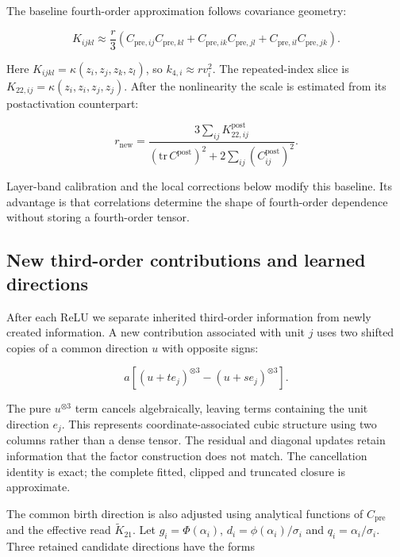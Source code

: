 \documentclass[11pt,letterpaper]{article}
\begin{document}
The baseline fourth-order approximation follows covariance geometry:

\begin{equation}
K_{ijkl}\approx\frac{r}{3}
\left(C_{\mathrm{pre},ij}C_{\mathrm{pre},kl}+C_{\mathrm{pre},ik}C_{\mathrm{pre},jl}+C_{\mathrm{pre},il}C_{\mathrm{pre},jk}\right).
\end{equation}

Here \(K_{ijkl}=\kappa(z_i,z_j,z_k,z_l)\), so \(k_{4,i}\approx r v_i^2\). The repeated-index slice is \(K_{22,ij}=\kappa(z_i,z_i,z_j,z_j)\). After the nonlinearity the scale is estimated from its postactivation counterpart:

\begin{equation}
r_{\mathrm{new}}=
\frac{3\sum_{ij}K^{\mathrm{post}}_{22,ij}}
{(\mathrm{tr}\,C^{\mathrm{post}})^2+2\sum_{ij}(C^{\mathrm{post}}_{ij})^2}.
\end{equation}

Layer-band calibration and the local corrections below modify this baseline. Its advantage is that correlations determine the shape of fourth-order dependence without storing a fourth-order tensor.

\subsection{New third-order contributions and learned directions}\label{new-third-order-contributions-and-learned-directions}

After each ReLU we separate inherited third-order information from newly created information. A new contribution associated with unit \(j\) uses two shifted copies of a common direction \(u\) with opposite signs:

\begin{equation}
a\left[(u+t e_j)^{\otimes3}-(u+s e_j)^{\otimes3}\right].
\end{equation}

The pure \(u^{\otimes3}\) term cancels algebraically, leaving terms containing the unit direction \(e_j\). This represents coordinate-associated cubic structure using two columns rather than a dense tensor. The residual and diagonal updates retain information that the factor construction does not match. The cancellation identity is exact; the complete fitted, clipped and truncated closure is approximate.

The common birth direction is also adjusted using analytical functions of \(C_{\mathrm{pre}}\) and the effective read \(\widetilde K_{21}\). Let \(g_i=\Phi(\alpha_i)\), \(d_i=\phi(\alpha_i)/\sigma_i\) and \(q_i=\alpha_i/\sigma_i\). Three retained candidate directions have the forms
\end{document}
